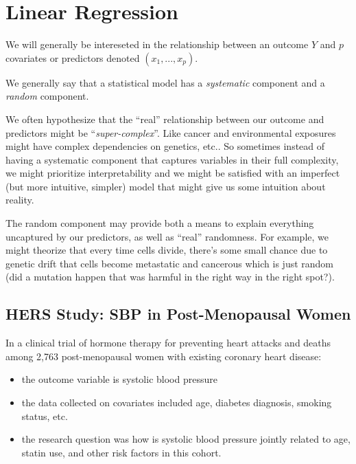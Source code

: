 \documentclass[
  letterpaper,
  DIV=11,
  numbers=noendperiod]{scrreport}
\providecommand{\tightlist}{%
  \setlength{\itemsep}{0pt}\setlength{\parskip}{0pt}}\usepackage{longtable,booktabs,array}
\begin{document}

\hypertarget{linear-regression}{%
\chapter{Linear Regression}\label{linear-regression}}

We will generally be intereseted in the relationship between an outcome
\(Y\) and \(p\) covariates or predictors denoted \((x_1, ..., x_p)\).

We generally say that a statistical model has a \emph{systematic}
component and a \emph{random} component.

We often hypothesize that the ``real'' relationship between our outcome
and predictors might be ``\emph{super-complex}''. Like cancer and
environmental exposures might have complex dependencies on genetics,
etc.. So sometimes instead of having a systematic component that
captures variables in their full complexity, we might prioritize
interpretability and we might be satisfied with an imperfect (but more
intuitive, simpler) model that might give us some intuition about
reality.

The random component may provide both a means to explain everything
uncaptured by our predictors, as well as ``real'' randomness. For
example, we might theorize that every time cells divide, there's some
small chance due to genetic drift that cells become metastatic and
cancerous which is just random (did a mutation happen that was harmful
in the right way in the right spot?).

\hypertarget{hers-study-sbp-in-post-menopausal-women}{%
\section{HERS Study: SBP in Post-Menopausal
Women}\label{hers-study-sbp-in-post-menopausal-women}}

In a clinical trial of hormone therapy for preventing heart attacks and
deaths among 2,763 post-menopausal women with existing coronary heart
disease:

\begin{itemize}
\tightlist
\item
  the outcome variable is systolic blood pressure
\item
  the data collected on covariates included age, diabetes diagnosis,
  smoking status, etc.
\item
  the research question was how is systolic blood pressure jointly
  related to age, statin use, and other risk factors in this cohort.
\end{itemize}
\end{document}
